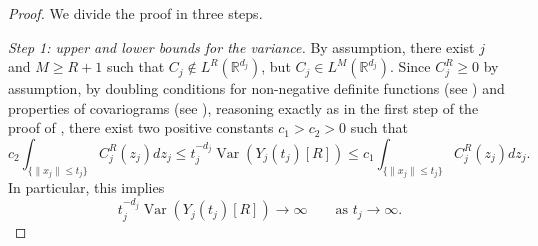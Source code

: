 \documentclass[12pt]{article}
\DeclareMathOperator{\var}{Var}
\DeclareMathOperator{\1}{1}
\newcommand{\R}{\mathbb{R}}
\renewcommand{\L}{ L}
\theoremstyle{plain}
\theoremstyle{definition}
\begin{document}
\begin{proof}
We divide the proof in three steps.

\bigskip

\textit{Step 1: upper and lower bounds for the variance.}
By assumption, there exist $j$ and $M\geq R+1$ such that $C_j\notin L^R(\R^{d_j})$, but $C_j\in \L^M(\R^{d_j})$. Since $C_j^R\ge0$ by assumption, by doubling conditions for non-negative definite functions (see \cite{Gorbachev}) and properties of covariograms (see \cite{Galerne}), reasoning exactly as in the first step of the proof of \cite[Proposition 9]{MN22}, there exist two positive constants $c_1>c_2>0$ such that
\[
c_2\int_{\{\|x_j\|\le t_j\}}C_j^R(z_j)dz_j\le t_j^{-d_j}\var(Y_j(t_j)[R])\le c_1\int_{\{\|x_j\|\le t_j\}}C_j^R(z_j)dz_j.
\]
In particular, this implies
\begin{equation}\label{equ:vartoinfty}
    t_j^{-d_j}\var(Y_j(t_j)[R])\rightarrow\infty \quad \quad \text{as }t_j\rightarrow\infty.
\end{equation}

\bigskip


\end{proof}
\end{document}
